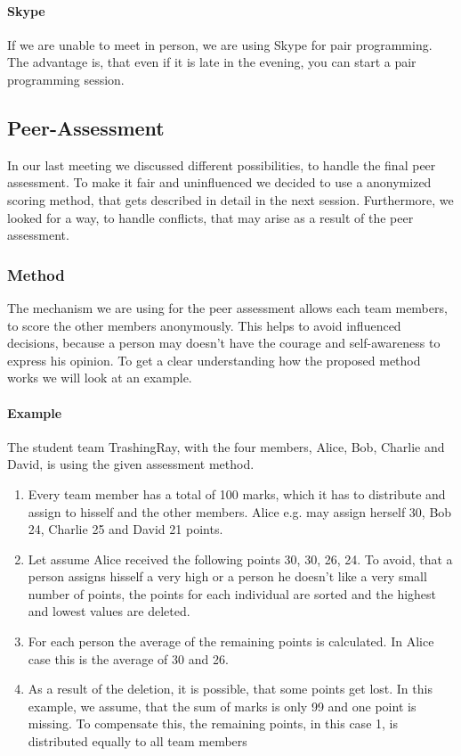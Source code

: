 \paragraph{Skype}

If we are unable to meet in person, we are using Skype for pair programming. The advantage is, that even if it is late in the evening, you can start a pair programming session. 

\subsection{Peer-Assessment}

In our last meeting we discussed different possibilities, to handle the final peer assessment. To make it fair and uninfluenced we decided to use a anonymized scoring method, that gets described in detail in the next session. Furthermore, we looked for a way, to handle conflicts, that may arise as a result of the peer assessment. 

\subsubsection{Method}

The mechanism we are using for the peer assessment allows each team members, to score the other members anonymously. This helps to avoid influenced decisions, because a person may doesn't have the courage and self-awareness to express his opinion. To get a clear understanding how the proposed method works we will look at an example.

\paragraph{Example}

The student team TrashingRay, with the four members, Alice, Bob, Charlie and David, is using the given assessment method. 

\begin{enumerate}  
\item Every team member has a total of 100 marks, which it has to distribute and assign to hisself and the other members. Alice e.g. may assign herself 30, Bob 24, Charlie 25 and David 21 points. 
\item Let assume Alice received the following points 30, 30, 26, 24. To avoid, that a person assigns hisself a very high or a person he doesn't like a very small number of points, the points for each individual are sorted and the highest and lowest values are deleted. 
\item For each person the average of the remaining points is calculated. In Alice case this is the average of 30 and 26. 
\item As a result of the deletion, it is possible, that some points get \grqq{}lost\grqq{}. In this example, we assume, that the sum of marks is only 99 and one point is missing. To compensate this, the remaining points, in this case 1, is distributed equally to all team members 
\end{enumerate}

